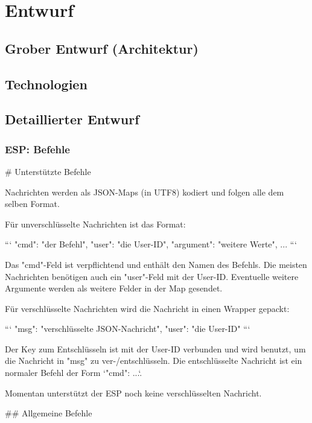 
\newpage

\chapter{Entwurf} %
\label{cha:entwurf}

\section{Grober Entwurf (Architektur)}
\label{sec:grober_entwurf}

\section{Technologien}
\label{sec:technologien}

\section{Detaillierter Entwurf}
\label{sec:detaillierter_entwurf}

\subsection{ESP: Befehle}
# Unterstützte Befehle

Nachrichten werden als JSON-Maps (in UTF8) kodiert und folgen alle dem selben Format.

Für unverschlüsselte Nachrichten ist das Format:

```
{"cmd": "der Befehl", "user": "die User-ID", "argument": "weitere Werte", ...}
```

Das "cmd"-Feld ist verpflichtend und enthält den Namen des Befehls. Die meisten Nachrichten benötigen auch ein "user"-Feld mit der User-ID. Eventuelle weitere Argumente werden als weitere Felder in der Map gesendet.

Für verschlüsselte Nachrichten wird die Nachricht in einen Wrapper gepackt:

```
{"msg": "verschlüsselte JSON-Nachricht", "user": "die User-ID"}
```

Der Key zum Entschlüsseln ist mit der User-ID verbunden und wird benutzt, um die Nachricht in "msg" zu ver-/entschlüsseln. Die entschlüsselte Nachricht ist ein normaler Befehl der Form `{"cmd": ...}`.

Momentan unterstützt der ESP noch keine verschlüsselten Nachricht.

## Allgemeine Befehle

